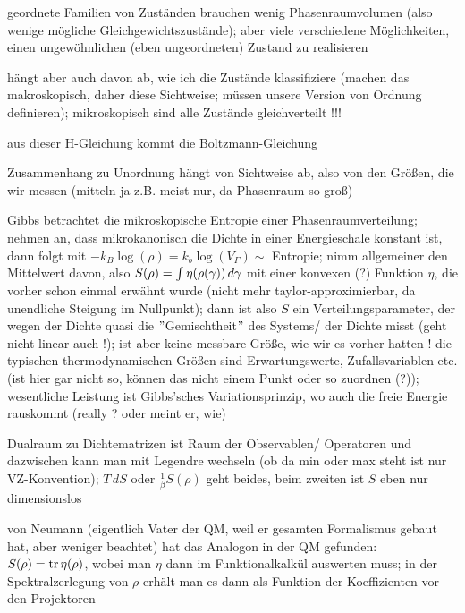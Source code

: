 \documentclass[../KlassMech_main.tex]{subfiles}
\begin{document}
geordnete Familien von Zuständen brauchen wenig Phasenraumvolumen (also wenige mögliche Gleichgewichtszustände); aber viele verschiedene Möglichkeiten, einen ungewöhnlichen (eben ungeordneten) Zustand zu realisieren

hängt aber auch davon ab, wie ich die Zustände klassifiziere (machen das makroskopisch, daher diese Sichtweise; müssen unsere Version von Ordnung definieren); mikroskopisch sind alle Zustände gleichverteilt !!!

aus dieser H-Gleichung kommt die Boltzmann-Gleichung


Zusammenhang zu Unordnung hängt von Sichtweise ab, also von den Größen, die wir messen (mitteln ja z.B. meist nur, da Phasenraum so groß)

Gibbs betrachtet die mikroskopische Entropie einer Phasenraumverteilung; nehmen an, dass mikrokanonisch die Dichte in einer Energieschale konstant ist, dann folgt mit $-k_B \log(\rho) = k_b \log(V_\Gamma) \sim$ Entropie; nimm allgemeiner den Mittelwert davon, also $S(\rho) = \int \eta\qty(\rho(\gamma)) \, d\gamma$ mit einer konvexen (?) Funktion $\eta$, die vorher schon einmal erwähnt wurde (nicht mehr taylor-approximierbar, da unendliche Steigung im Nullpunkt); dann ist also $S$ ein Verteilungsparameter, der wegen der Dichte quasi die $"$Gemischtheit$"$ des Systems/ der Dichte misst (geht nicht linear auch !); ist aber keine messbare Größe, wie wir es vorher hatten ! die typischen thermodynamischen Größen sind Erwartungswerte, Zufallsvariablen etc. (ist hier gar nicht so, können das nicht einem Punkt oder so zuordnen (?)); wesentliche Leistung ist Gibbs'sches Variationsprinzip, wo auch die freie Energie rauskommt (really ? oder meint er, wie)

Dualraum zu Dichtematrizen ist Raum der Observablen/ Operatoren und dazwischen kann man mit Legendre wechseln (ob da min oder max steht ist nur VZ-Konvention); $T \, dS$ oder $\frac{1}{\beta} S(\rho)$ geht beides, beim zweiten ist $S$ eben nur dimensionslos


von Neumann (eigentlich Vater der QM, weil er gesamten Formalismus gebaut hat, aber weniger beachtet) hat das Analogon in der QM gefunden: $S(\rho) = \tr \eta(\rho)$, wobei man $\eta$ dann im Funktionalkalkül auswerten muss; in der Spektralzerlegung von $\rho$ erhält man es dann als Funktion der Koeffizienten vor den Projektoren
\end{document}
